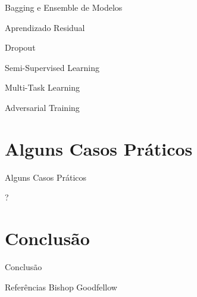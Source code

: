 \documentclass{beamer}
\begin{document}
\begin{frame}{Bagging e Ensemble de Modelos}
\end{frame}


\begin{frame}{Aprendizado Residual}
\end{frame}

\begin{frame}{Dropout}
\end{frame}


\begin{frame}{Semi-Supervised Learning}
\end{frame}

\begin{frame}{Multi-Task Learning}
\end{frame}


\begin{frame}{Adversarial Training}
\end{frame}


\section{Alguns Casos Práticos}
\begin{frame}{Alguns Casos Práticos}
\end{frame}
?

\section{Conclusão}

\begin{frame}{Conclusão}
\end{frame}

\begin{frame}{Referências}
  Bishop
  Goodfellow
\end{frame}
\end{document}
